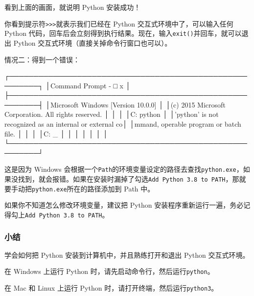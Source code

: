 看到上面的画面，就说明 Python 安装成功！

你看到提示符\texttt{\textgreater{}\textgreater{}\textgreater{}}就表示我们已经在
Python 交互式环境中了，可以输入任何 Python
代码，回车后会立刻得到执行结果。现在，输入\texttt{exit()}并回车，就可以退出
Python 交互式环境（直接关掉命令行窗口也可以）。

情况二：得到一个错误：

\begin{pythoncode}
┌────────────────────────────────────────────────────────┐
│Command Prompt                                    - □ x │
├────────────────────────────────────────────────────────┤
│Microsoft Windows [Version 10.0.0]                      │
│(c) 2015 Microsoft Corporation. All rights reserved.    │
│                                                        │
│C:\> python                                             │
│'python' is not recognized as an internal or external co│
│mmand, operable program or batch file.                  │
│                                                        │
│C:\> _                                                  │
│                                                        │
│                                                        │
│                                                        │
└────────────────────────────────────────────────────────┘
\end{pythoncode}

这是因为 Windows
会根据一个\texttt{Path}的环境变量设定的路径去查找\texttt{python.exe}，如果没找到，就会报错。如果在安装时漏掉了勾选\texttt{Add\ Python\ 3.8\ to\ PATH}，那就要手动把\texttt{python.exe}所在的路径添加到
Path 中。

如果你不知道怎么修改环境变量，建议把 Python
安装程序重新运行一遍，务必记得勾上\texttt{Add\ Python\ 3.8\ to\ PATH}。

\hypertarget{ux5c0fux7ed3}{%
\subsubsection{小结}\label{ux5c0fux7ed3}}

学会如何把 Python 安装到计算机中，并且熟练打开和退出 Python 交互式环境。

在 Windows 上运行 Python 时，请先启动命令行，然后运行\texttt{python}。

在 Mac 和 Linux 上运行 Python 时，请打开终端，然后运行\texttt{python3}。

